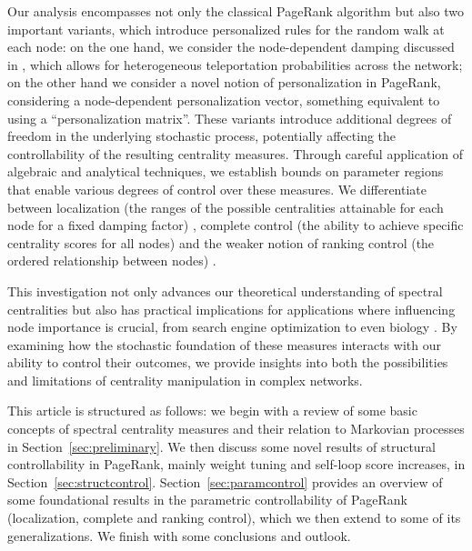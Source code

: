\documentclass[sn-mathphys-ay]{sn-jnl}%
\theoremstyle{thmstyleone}%
\theoremstyle{thmstyletwo}%
\theoremstyle{thmstylethree}%
\begin{document}
Our analysis encompasses not only the classical PageRank algorithm but also two important variants, which introduce personalized rules for the random walk at each node: on the one hand, we consider the node-dependent damping discussed in \cite{avrachenkov2014personalized}, which allows for heterogeneous teleportation probabilities across the network; on the other hand we consider a novel notion of personalization in PageRank, considering a node-dependent personalization vector, something equivalent to using a ``personalization matrix''. These variants introduce additional degrees of freedom in the underlying stochastic process, potentially affecting the controllability of the resulting centrality measures. Through careful application of algebraic and analytical techniques, we establish bounds on parameter regions that enable various degrees of control over these measures. We differentiate between localization (the ranges of the possible centralities attainable for each node for a fixed damping factor) \cite{garcia2012localization}, complete control (the ability to achieve specific centrality scores for all nodes) and the weaker notion of ranking control (the ordered relationship between nodes) \cite{contrerasaso2023pagerank}.

This investigation not only advances our theoretical understanding of spectral centralities but also has practical implications for applications where influencing node importance is crucial, from search engine optimization \cite{chaffey2009search} to even  biology \cite{morrison2005generank,gleich2015pagerank}. By examining how the stochastic foundation of these measures interacts with our ability to control their outcomes, we provide insights into both the possibilities and limitations of centrality manipulation in complex networks.

This article is structured as follows: we begin with a review of some basic concepts of spectral centrality measures and their relation to Markovian processes in Section~\ref{sec:preliminary}. We then discuss some novel results of structural controllability in PageRank, mainly weight tuning and self-loop score increases, in Section~\ref{sec:structcontrol}. Section~\ref{sec:paramcontrol} provides an overview of some foundational results in the parametric controllability of PageRank (localization, complete and ranking control), which we then extend to some of its generalizations. We finish with some conclusions and outlook.



\end{document}
